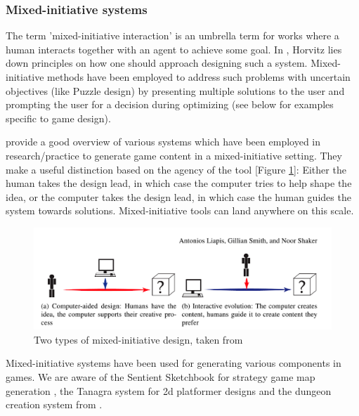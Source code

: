 \subsubsection{Mixed-initiative systems}
The term 'mixed-initiative interaction' is an umbrella term for works where a human interacts together with an agent to achieve some goal. In \cite{Horvitz1999}, Horvitz lies down principles on how one should approach designing such a system. Mixed-initiative methods have been employed to address such problems with uncertain objectives (like Puzzle design) by presenting multiple solutions to the user and prompting the user for a decision during optimizing (see below for examples specific to game design). %

\cite{Liapis2016} provide a good overview of various systems which have been employed in research/practice to generate game content in a mixed-initiative setting. They make a useful distinction based on the agency of the tool [Figure \ref{fig:mixedinitiativeimg}]: Either the human takes the design lead, in which case the computer tries to help shape the idea, or the computer takes the design lead, in which case the human guides the system towards solutions. Mixed-initiative tools can land anywhere on this scale.

\begin{figure}
    \centering
    \includegraphics[width=1.0\linewidth]{figures/cadvsinteractiveevol.png}
    
    \caption[Two types of mixed-initiative design]{ Two types of mixed-initiative design, taken from \cite{Liapis2016} %
      \label{fig:mixedinitiativeimg}}
\end{figure}

Mixed-initiative systems have been used for generating various components in games. We are aware of the Sentient Sketchbook for strategy game map generation \cite{Liapis2013}, the Tanagra system for 2d platformer designs  \cite{Smith2011} and the dungeon creation system from \cite{Baldwin2017}.

